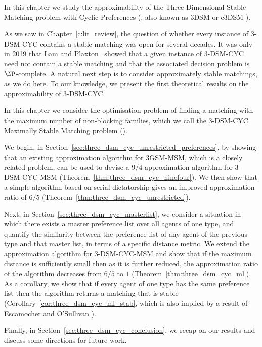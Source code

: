 In this chapter we study the approximability of the Three-Dimensional Stable Matching problem with Cyclic Preferences (, also known as 3DSM \cite{BM10} or c3DSM \cite{Pashkovich20}).

As we saw in Chapter~\ref{c:lit_review}, the question of whether every instance of 3-DSM-CYC contains a stable matching was open for several decades. It was only in 2019 that Lam and Plaxton~\cite{Plaxton3DSMCYCJournal} showed that a given instance of 3-DSM-CYC need not contain a stable matching and that the associated decision problem is $\NP$-complete. A natural next step is to consider approximately stable matchings, as we do here. To our knowledge, we present the first theoretical results on the approximability of 3-DSM-CYC. 

In this chapter we consider the optimisation problem of finding a matching with the maximum number of non-blocking families, which we call the {3-DSM-CYC Maximally Stable Matching problem} ().

We begin, in Section~\ref{sec:three_dsm_cyc_unrestricted_preferences}, by showing that an existing approximation algorithm for 3GSM-MSM, which is a closely related problem, can be used to devise a $9/4$-approximation algorithm for 3-DSM-CYC-MSM (Theorem~\ref{thm:three_dsm_cyc_ninefour}). We then show that a simple algorithm based on serial dictatorship gives an improved approximation ratio of $6/5$ (Theorem~\ref{thm:three_dsm_cyc_unrestricted}).

Next, in Section~\ref{sec:three_dsm_cyc_masterlist}, we consider a situation in which there exists a master preference list over all agents of one type, and quantify the similarity between the preference list of any agent of the previous type and that master list, in terms of a specific distance metric. We extend the approximation algorithm for 3-DSM-CYC-MSM and show that if the maximum distance is sufficiently small then as it is further reduced, the approximation ratio of the algorithm decreases from $6/5$ to $1$ (Theorem~\ref{thm:three_dsm_cyc_ml}). As a corollary, we show that if every agent of one type has the same preference list then the algorithm returns a matching that is stable (Corollary~\ref{cor:three_dsm_cyc_ml_stab}, which is also implied by a result of Escamocher and O'Sullivan \cite{Escamocher2018}).

Finally, in Section~\ref{sec:three_dsm_cyc_conclusion}, we recap on our results and discuss some directions for future work.

